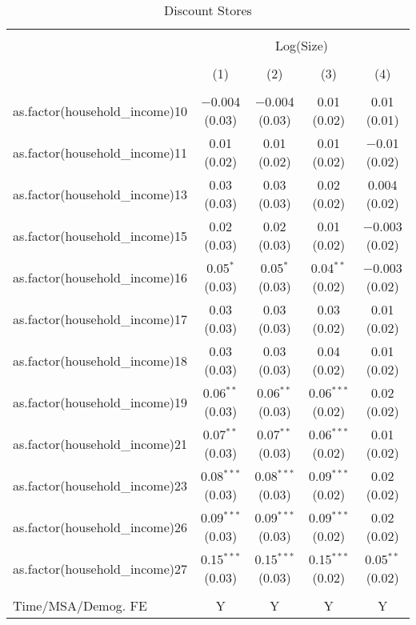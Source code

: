 
\begin{table}[!htbp] \centering 
  \caption{Discount Stores} 
  \label{tab:packageSizeDiscountappendix} 
\begin{tabular}{@{\extracolsep{5pt}}lcccc} 
\\[-1.8ex]\hline 
\hline \\[-1.8ex] 
 & \multicolumn{4}{c}{Log(Size)} \\ 
\\[-1.8ex] & (1) & (2) & (3) & (4)\\ 
\hline \\[-1.8ex] 
 as.factor(household\_income)10 & $-$0.004 (0.03) & $-$0.004 (0.03) & 0.01 (0.02) & 0.01 (0.01) \\ 
  as.factor(household\_income)11 & 0.01 (0.02) & 0.01 (0.02) & 0.01 (0.02) & $-$0.01 (0.02) \\ 
  as.factor(household\_income)13 & 0.03 (0.03) & 0.03 (0.03) & 0.02 (0.02) & 0.004 (0.02) \\ 
  as.factor(household\_income)15 & 0.02 (0.03) & 0.02 (0.03) & 0.01 (0.02) & $-$0.003 (0.02) \\ 
  as.factor(household\_income)16 & 0.05$^{*}$ (0.03) & 0.05$^{*}$ (0.03) & 0.04$^{**}$ (0.02) & $-$0.003 (0.02) \\ 
  as.factor(household\_income)17 & 0.03 (0.03) & 0.03 (0.03) & 0.03 (0.02) & 0.01 (0.02) \\ 
  as.factor(household\_income)18 & 0.03 (0.03) & 0.03 (0.03) & 0.04 (0.02) & 0.01 (0.02) \\ 
  as.factor(household\_income)19 & 0.06$^{**}$ (0.03) & 0.06$^{**}$ (0.03) & 0.06$^{***}$ (0.02) & 0.02 (0.02) \\ 
  as.factor(household\_income)21 & 0.07$^{**}$ (0.03) & 0.07$^{**}$ (0.03) & 0.06$^{***}$ (0.02) & 0.01 (0.02) \\ 
  as.factor(household\_income)23 & 0.08$^{***}$ (0.03) & 0.08$^{***}$ (0.03) & 0.09$^{***}$ (0.02) & 0.02 (0.02) \\ 
  as.factor(household\_income)26 & 0.09$^{***}$ (0.03) & 0.09$^{***}$ (0.03) & 0.09$^{***}$ (0.02) & 0.02 (0.02) \\ 
  as.factor(household\_income)27 & 0.15$^{***}$ (0.03) & 0.15$^{***}$ (0.03) & 0.15$^{***}$ (0.02) & 0.05$^{**}$ (0.02) \\ 
 \hline \\[-1.8ex] 
Time/MSA/Demog. FE & Y & Y & Y & Y \\ 

\end{tabular}
\end{table}
